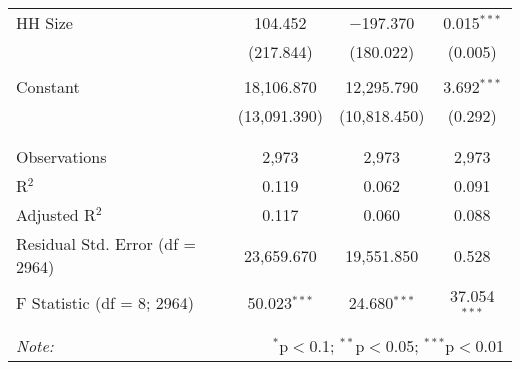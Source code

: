 \begin{table}[!htbp]
\begin{tabular}{@{\extracolsep{5pt}}lccc}
 HH Size & 104.452 & $-$197.370 & 0.015$^{***}$ \\ 
  & (217.844) & (180.022) & (0.005) \\ 
  & & & \\ 
 Constant & 18,106.870 & 12,295.790 & 3.692$^{***}$ \\ 
  & (13,091.390) & (10,818.450) & (0.292) \\ 
  & & & \\ 
\hline \\[-1.8ex] 
Observations & 2,973 & 2,973 & 2,973 \\ 
R$^{2}$ & 0.119 & 0.062 & 0.091 \\ 
Adjusted R$^{2}$ & 0.117 & 0.060 & 0.088 \\ 
Residual Std. Error (df = 2964) & 23,659.670 & 19,551.850 & 0.528 \\ 
F Statistic (df = 8; 2964) & 50.023$^{***}$ & 24.680$^{***}$ & 37.054$^{***}$ \\ 
\hline 
\hline \\[-1.8ex] 
\textit{Note:}  & \multicolumn{3}{r}{$^{*}$p$<$0.1; $^{**}$p$<$0.05; $^{***}$p$<$0.01} \\ 
\end{tabular} 
\end{table} 
